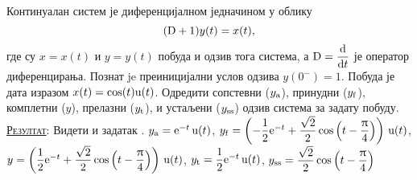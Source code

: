 \PID
Континуалан 
систем је 
диференцијалном једначином у облику 
$$
({\rm D} + 1) y(t) = x(t),
$$ где су 
$x = x(t)$ и $y = y(t)$ побуда и одзив 
тога система, а 
${\rm D} = \dfrac{{\rm d}}{{\rm d} t}$ је 
оператор диференцирања. 
Познат je преиницијални услов 
одзива $y(0^-) = 1$.
Побуда је дата изразом 
$x(t) = \cos(t) {\rm u}(t)$. Одредити сопстевни
($y_{\rm a}$), 
принудни
($y_{\rm f}$), 
комплетни
($y$), 
прелазни
($y_{\rm t}$),
 и устаљени
($y_{\rm ss}$) одзив система за задату побуду.
\\[2mm]

\textsc{\underline{Резултат}}: Видети и задатак \label{z:RL_kolo}.
$y_{\rm a} = {\rm e}^{-t} \, {\rm u}(t)$, 
$y_{\rm f} = 
\left( 
-\dfrac{1}{2} {\rm e}^{-t} 
+ \dfrac{\sqrt 2}{2} 
\cos
\left(
t - \dfrac{\uppi}{4}
\right)
\right)\,{\rm u}(t)$, \\
$y = 
\left( 
\dfrac{1}{2} {\rm e}^{-t} 
+ \dfrac{\sqrt 2}{2} 
\cos
\left(
t - \dfrac{\uppi}{4}
\right)
\right)\,{\rm u}(t)
$, 
$
y_{\rm t} = 
\dfrac{1}{2} {\rm e}^{-t} \, {\rm u}(t)
$,
$y_{\rm ss} = 
\dfrac{\sqrt 2}{ 2} 
\cos
\left(
t - \dfrac{\uppi}{4}
\right)
$